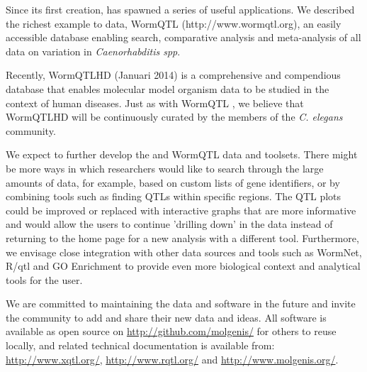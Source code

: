 Since its first creation, \xqtlwb has spawned a series of useful applications. We described 
the richest example to data, WormQTL (http://www.wormqtl.org), an easily accessible database enabling 
search, comparative analysis and meta-analysis of all data on variation in \emph{Caenorhabditis spp}. 

Recently, WormQTLHD (Januari 2014) is a comprehensive and compendious database that enables molecular 
model organism data to be studied in the context of human diseases. Just as with WormQTL \cite{Snoek:2012}, 
we believe that WormQTLHD will be continuously curated by the members of the \emph{C. elegans} community. 

We expect to further develop the \xqtlwb and WormQTL data and toolsets. There might be more ways in which 
researchers would like to search through the large amounts of data, for example, based on custom lists of 
gene identifiers, or by combining tools such as finding QTLs within specific regions. The QTL plots could 
be improved or replaced with interactive graphs that are more informative and would allow the users to 
continue 'drilling down' in the data instead of returning to the home page for a new analysis with a 
different tool. Furthermore, we envisage close integration with other data sources and tools such as WormNet, 
R/qtl and GO Enrichment to provide even more biological context and analytical tools for the user. 

We are committed to maintaining the data and software in the future and invite the community to add and 
share their new data and ideas. All software is available as open source on \url{http://github.com/molgenis/} 
for others to reuse locally, and related technical documentation is available from:\\ \url{http://www.xqtl.org/}, 
\url{http://www.rqtl.org/} and \url{http://www.molgenis.org/}.

